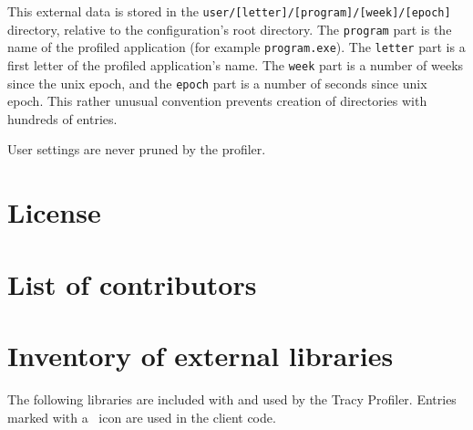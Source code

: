 \documentclass[hidelinks,titlepage,a4paper]{article}
\begin{document}
This external data is stored in the \texttt{user/[letter]/[program]/[week]/[epoch]} directory, relative to the configuration's root directory. The \texttt{program} part is the name of the profiled application (for example \texttt{program.exe}). The \texttt{letter} part is a first letter of the profiled application's name. The \texttt{week} part is a number of weeks since the unix epoch, and the \texttt{epoch} part is a number of seconds since unix epoch. This rather unusual convention prevents creation of directories with hundreds of entries.

User settings are never pruned by the profiler.

\newpage
\appendix
\appendixpage

\section{License}



\section{List of contributors}



\section{Inventory of external libraries}

The following libraries are included with and used by the Tracy Profiler. Entries marked with a \faStar{}~icon are used in the client code.
\end{document}
